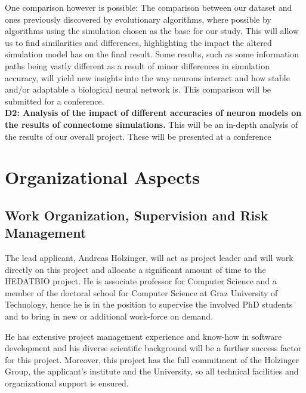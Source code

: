 \documentclass[a4paper,11pt]{article}
\begin{document}
One comparison however is possible: The comparison between our dataset and ones previously discovered by evolutionary algorithms, where possible by algorithms using the simulation chosen as the base for our study. This will allow us to find similarities and differences, highlighting the impact the altered simulation model has on the final result. Some results, such as some information paths being vastly different as a result of minor differences in simulation accuracy, will yield new insights into the way neurons interact and how stable and/or adaptable a biological neural network is. This comparison will be submitted for a conference. 
\\[0,2cm]

\textbf{D2: Analysis of the impact of different accuracies of neuron models on the results of connectome simulations.} This will be an in-depth analysis of the results of our overall project. These will be presented at a conference  


\newpage

\section{Organizational Aspects}

\subsection{Work Organization, Supervision and Risk Management}

The lead applicant, Andreas Holzinger, will act as project leader and will work directly on this project and allocate a significant amount of time to the HEDATBIO project. He is associate professor for Computer Science and a member of the doctoral school for Computer Science at Graz University of Technology, hence he is in the position to supervise the involved PhD students and to bring in new or additional work-force on demand.

He has extensive project management experience and know-how in software development and his diverse scientific background will be a further success factor for this project. Moreover, this project has the full commitment of the Holzinger Group, the applicant's institute and the University, so all technical facilities and organizational support is ensured.
\\[0,2cm]
\end{document}
